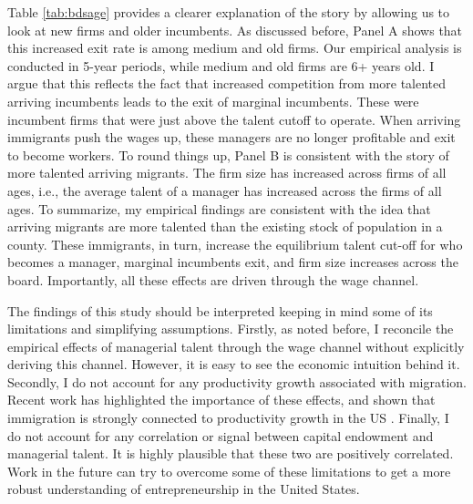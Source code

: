 Table \ref{tab:bdsage} provides a clearer explanation of the story by allowing us to look at new firms and older incumbents. As discussed before, Panel A shows that this increased exit rate is among medium and old firms. Our empirical analysis is conducted in 5-year periods, while medium and old firms are 6+ years old. I argue that this reflects the fact that increased competition from more talented arriving incumbents leads to the exit of marginal incumbents. These were incumbent firms that were just above the talent cutoff to operate. When arriving immigrants push the wages up, these managers are no longer profitable and exit to become workers. To round things up, Panel B is consistent with the story of more talented arriving migrants. The firm size has increased across firms of all ages, i.e., the average talent of a manager has increased across the firms of all ages. To summarize, my empirical findings are consistent with the idea that arriving migrants are more talented than the existing stock of population in a county. These immigrants, in turn, increase the equilibrium talent cut-off for who becomes a manager, marginal incumbents exit, and firm size increases across the board. Importantly, all these effects are driven through the wage channel.

The findings of this study should be interpreted keeping in mind some of its limitations and simplifying assumptions. Firstly, as noted before, I reconcile the empirical effects of managerial talent through the wage channel without explicitly deriving this channel. However, it is easy to see the economic intuition behind it. Secondly, I do not account for any productivity growth associated with migration. Recent work has highlighted the importance of these effects, and shown that immigration is strongly connected to productivity growth in the US \citep{EffectofImmigrationProductivity, ImmigrationInnovationGrowth}. Finally, I do not account for any correlation or signal between capital endowment and managerial talent. It is highly plausible that these two are positively correlated. Work in the future can try to overcome some of these limitations to get a more robust understanding of entrepreneurship in the United States.  